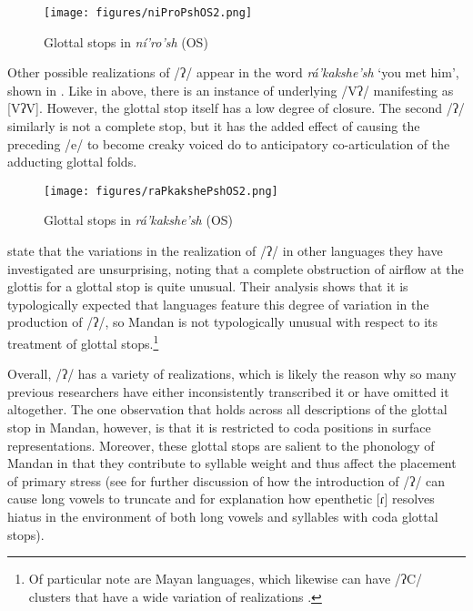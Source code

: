 \begin{figure}
\caption{Glottal stops in \textit{ní'ro'sh} (OS)}\label{OSglottals1}
\texttt{[image: figures/niProPshOS2.png]}

\end{figure}

Other possible realizations of /ʔ/ appear in the word \textit{rá'kakshe'sh} `you met him', shown   in . Like in  above, there is an instance of underlying /Vʔ/ manifesting as [VʔV]. However, the glottal stop itself has a low degree of closure. The second /ʔ/ similarly is not a complete stop, but it has the added effect of causing the preceding /e/ to become creaky voiced do to anticipatory co-articulation of the adducting glottal folds.

\begin{figure}
\caption{Glottal stops in \textit{rá'kakshe'sh} (OS)}\label{OSglottals2}
\texttt{[image: figures/raPkakshePshOS2.png]}

\end{figure}

\citet[94]{pierrehumberttalkin1992} state that the variations in the realization of /ʔ/ in other languages they have investigated are unsurprising, noting that a complete obstruction of airflow at the glottis for a glottal stop is quite unusual. Their analysis shows that it is typologically expected that languages feature this degree of variation in the production of /ʔ/, so Mandan is not typologically unusual with respect to its treatment of glottal stops.\footnote{Of particular note are Mayan languages, which likewise can have /ʔC/ clusters that have a wide variation of realizations \citep{baird2010, bennettTA}.}

Overall, /ʔ/ has a variety of realizations, which is likely the reason why so many previous researchers have either inconsistently transcribed it or have omitted it altogether. The one observation that holds across all descriptions of the glottal stop in Mandan, however, is that it is restricted to coda positions in surface representations. Moreover, these glottal stops are salient to the phonology of Mandan in that they contribute to syllable weight and thus affect the placement of primary stress (see  for further discussion of how the introduction of /ʔ/ can cause long vowels to truncate and  for explanation how epenthetic [ɾ] resolves hiatus in the environment of both long vowels and syllables with coda glottal stops).

